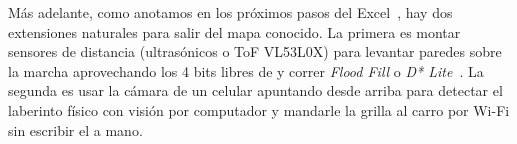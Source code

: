 Más adelante, como anotamos en los próximos pasos del Excel~\cite{excel2026organizacion}, hay dos extensiones naturales para salir del mapa conocido. La primera es montar sensores de distancia (ultrasónicos o ToF VL53L0X) para levantar paredes sobre la marcha aprovechando los 4 bits libres de  y correr \emph{Flood Fill} o \emph{D* Lite}~\cite{russell2021aima,siegwart2011autonomous}. La segunda es usar la cámara de un celular apuntando desde arriba para detectar el laberinto físico con visión por computador y mandarle la grilla al carro por Wi-Fi sin escribir el  a mano.
